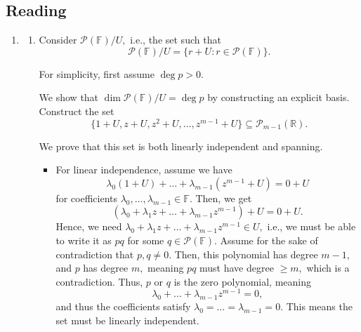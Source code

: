 \documentclass[12pt]{article}
\begin{document}
\subsection{Reading}
\begin{enumerate}
  \item[13]
    \begin{enumerate}
      \item Consider $\mathcal P(\mathbb F) / U,$ i.e., the set such that
        $$
        \mathcal P(\mathbb F) /U = \{r + U : r \in \mathcal P(\mathbb F)\}.
        $$

        For simplicity, first assume $\deg p > 0.$

        We show that $\dim \mathcal P(\mathbb F) / U = \deg p$ by
        constructing an explicit basis. Construct the set
        $$
        \{1 + U, z + U, z^2 + U, \ldots, z^{m - 1} + U\} \subseteq
        \mathcal P_{m - 1}(\mathbb R).
        $$

        We prove that this set is both linearly independent and spanning.

        \begin{itemize}
          \item
            For linear independence, assume we have
            $$
            \lambda_0(1 + U) + \ldots + \lambda_{m - 1}(z^{m - 1} + U) = 0 + U
            $$
            for coefficients $\lambda_0, \ldots, \lambda_{m - 1} \in
            \mathbb F.$ Then, we get
            $$
            (\lambda_0 + \lambda_1 z + \ldots + \lambda_{m
            -1}z^{m-1}) + U = 0 + U.
            $$
            Hence, we need $\lambda_0 + \lambda_1 z + \ldots +
            \lambda_{m-1}z^{m-1} \in U,$ i.e., we must be able to
            write it as $pq$ for some $q \in \mathcal P(\mathbb F).$
            Assume for the sake of contradiction that $p, q \neq 0.$
            Then, this polynomial has degree $m - 1,$ and $p$ has
            degree $m,$ meaning $pq$ must have degree $\geq m,$ which
            is a contradiction. Thus, $p$ or $q$ is the zero
            polynomial, meaning $$\lambda_0 + \ldots +
            \lambda_{m-1}z^{m -1} = 0,$$ and thus the coefficients
            satisfy $\lambda_0 = \ldots = \lambda_{m-1} = 0.$ This
            means the set must be linearly independent.


\end{itemize}
\end{enumerate}
\end{enumerate}
\end{document}
